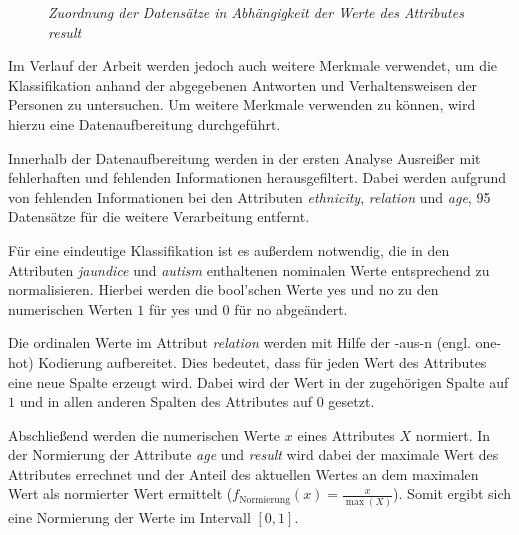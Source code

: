 \begin{figure}[h!]
\centering

\caption{\em Zuordnung der Datensätze in Abhängigkeit der Werte des Attributes \glqq \textit{result}\grqq}
\label{fig:result_classification}
\end{figure}

Im Verlauf der Arbeit werden jedoch auch weitere Merkmale verwendet, um die Klassifikation anhand der abgegebenen Antworten und Verhaltensweisen der Personen zu untersuchen. Um weitere Merkmale verwenden zu können, wird hierzu eine Datenaufbereitung durchgeführt.

Innerhalb der Datenaufbereitung werden in der ersten Analyse Ausreißer mit fehlerhaften und fehlenden Informationen herausgefiltert. Dabei werden aufgrund von fehlenden Informationen bei den Attributen \textit{ethnicity}, \textit{relation} und \textit{age}, 95 Datensätze für die weitere Verarbeitung entfernt.

Für eine eindeutige Klassifikation ist es außerdem notwendig, die in den Attributen \textit{jaundice} und \textit{autism} enthaltenen nominalen Werte entsprechend zu normalisieren. Hierbei werden die bool'schen Werte \glqq yes\grqq{} und \glqq no\grqq{} zu den numerischen Werten $1$ für \glqq yes\grqq{} und $0$ für \glqq no\grqq{} abgeändert. 

Die ordinalen Werte im Attribut \textit{relation} werden mit Hilfe der -aus-n\grqq{} (engl. \glqq one-hot\grqq) Kodierung aufbereitet. Dies bedeutet, dass für jeden Wert des Attributes eine neue Spalte erzeugt wird. Dabei wird der Wert in der zugehörigen Spalte auf $1$ und in allen anderen Spalten des Attributes auf $0$ gesetzt. %

Abschließend werden die numerischen Werte $x$ eines Attributes $X$ normiert. In der Normierung der Attribute \textit{age} und \textit{result} wird dabei der maximale Wert des Attributes errechnet und der Anteil des aktuellen Wertes an dem maximalen Wert als normierter Wert ermittelt ($f_{\text{Normierung}}(x) = \frac{x}{\max(X)}$). Somit ergibt sich eine Normierung der Werte im Intervall $[0,1]$.

